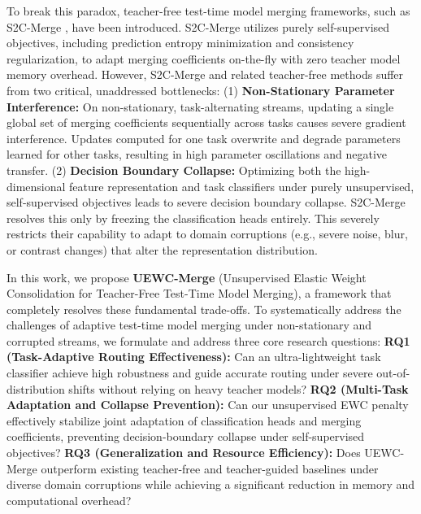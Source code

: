 \documentclass{article}
\theoremstyle{plain}
\theoremstyle{definition}
\theoremstyle{remark}
\begin{document}
To break this paradox, teacher-free test-time model merging frameworks, such as S2C-Merge \cite{S2C26}, have been introduced. S2C-Merge utilizes purely self-supervised objectives, including prediction entropy minimization and consistency regularization, to adapt merging coefficients on-the-fly with zero teacher model memory overhead. However, S2C-Merge and related teacher-free methods suffer from two critical, unaddressed bottlenecks: (1) \textbf{Non-Stationary Parameter Interference:} On non-stationary, task-alternating streams, updating a single global set of merging coefficients sequentially across tasks causes severe gradient interference. Updates computed for one task overwrite and degrade parameters learned for other tasks, resulting in high parameter oscillations and negative transfer. (2) \textbf{Decision Boundary Collapse:} Optimizing both the high-dimensional feature representation and task classifiers under purely unsupervised, self-supervised objectives leads to severe decision boundary collapse. S2C-Merge resolves this only by freezing the classification heads entirely. This severely restricts their capability to adapt to domain corruptions (e.g., severe noise, blur, or contrast changes) that alter the representation distribution.

In this work, we propose \textbf{UEWC-Merge} (Unsupervised Elastic Weight Consolidation for Teacher-Free Test-Time Model Merging), a framework that completely resolves these fundamental trade-offs. To systematically address the challenges of adaptive test-time model merging under non-stationary and corrupted streams, we formulate and address three core research questions:
\textbf{RQ1 (Task-Adaptive Routing Effectiveness):} Can an ultra-lightweight task classifier achieve high robustness and guide accurate routing under severe out-of-distribution shifts without relying on heavy teacher models?
\textbf{RQ2 (Multi-Task Adaptation and Collapse Prevention):} Can our unsupervised EWC penalty effectively stabilize joint adaptation of classification heads and merging coefficients, preventing decision-boundary collapse under self-supervised objectives?
\textbf{RQ3 (Generalization and Resource Efficiency):} Does UEWC-Merge outperform existing teacher-free and teacher-guided baselines under diverse domain corruptions while achieving a significant reduction in memory and computational overhead?
\end{document}
